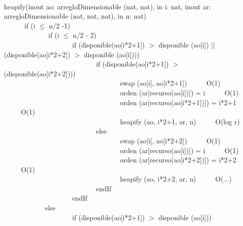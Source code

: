 \documentclass[a4paper,10pt]{article}
\begin{document}
\begin{algoritmo}
\caption{}\\
  heapify(inout ao: arregloDimensionable (nat, nat), in i: nat, inout ar:  arregloDimensionable (nat, nat, nat), in n: nat)\\
	\indent \ \ \ \ \ \  if (i $\leq$ n/2 -1)   \\
	\indent \ \ \ \ \ \ \ \ \ \ \ \ \ if (i $\leq$ n/2 - 2)   \\
	\indent \ \ \ \ \ \ \ \ \ \ \ \ \ \ \ \ \ \ \ \ if (disponible(ao[i*2+1]) $>$ disponible (ao[i]) $||$ (disponible(ao[i*2+2]) $>$ disponible (ao[i]))) \\
	\indent \ \ \ \ \ \ \ \ \ \ \ \ \ \ \ \ \ \ \ \ \ \ \ \ \ \ \ if (disponible(ao[i*2+1]) $>$ (disponible(ao[i*2+2])))  \\
	\indent \ \ \ \ \ \ \ \ \ \ \ \ \ \ \ \ \ \ \ \ \ \ \ \ \ \ \ \ \ \ \ \ \ \ swap (ao[i], ao[i*2+1]) \ \ \ \ \ O(1) \\
	\indent \ \ \ \ \ \ \ \ \ \ \ \ \ \ \ \ \ \ \ \ \ \ \ \ \ \ \ \ \ \ \ \ \ \ orden (ar[recurso(ao[i])]) = i  \ \ \ \ \ O(1) \\
	\indent \ \ \ \ \ \ \ \ \ \ \ \ \ \ \ \ \ \ \ \ \ \ \ \ \ \ \ \ \ \ \ \ \ \ orden (ar[recurso(ao[i*2+1])]) = i*2+1  \ \ \ \ \ O(1) \\
	\indent \ \ \ \ \ \ \ \ \ \ \ \ \ \ \ \ \ \ \ \ \ \ \ \ \ \ \ \ \ \ \ \ \ \ heapify (ao, i*2+1, ar, n) \ \ \ \ \ O(log r) \\
	\indent \ \ \ \ \ \ \ \ \ \ \ \ \ \ \ \ \ \ \ \ \ \ \ \ \ \ \ else \\
	\indent \ \ \ \ \ \ \ \ \ \ \ \ \ \ \ \ \ \ \ \ \ \ \ \ \ \ \ \ \ \ \ \ \ \ swap (ao[i], ao[i*2+2]) \ \ \ \ \ O(1) \\
	\indent \ \ \ \ \ \ \ \ \ \ \ \ \ \ \ \ \ \ \ \ \ \ \ \ \ \ \ \ \ \ \ \ \ \ orden (ar[recurso(ao[i])]) = i  \ \ \ \ \ O(1) \\
	\indent \ \ \ \ \ \ \ \ \ \ \ \ \ \ \ \ \ \ \ \ \ \ \ \ \ \ \ \ \ \ \ \ \ \ orden (ar[recurso(ao[i*2+2])]) = i*2+2  \ \ \ \ \ O(1) \\
	\indent \ \ \ \ \ \ \ \ \ \ \ \ \ \ \ \ \ \ \ \ \ \ \ \ \ \ \ \ \ \ \ \ \ \ heapify (ao, i*2+2, ar, n) \ \ \ \ \ O(...) \\
	\indent \ \ \ \ \ \ \ \ \ \ \ \ \ \ \ \ \ \ \ \ \ \ \ \ \ \ \ endIf \\
	\indent \ \ \ \ \ \ \ \ \ \ \ \ \ \ \ \ \ \ \ \  endIf \\
	\indent \ \ \ \ \ \ \ \ \ \ \ \  else \\
	\indent \ \ \ \ \ \ \ \ \ \ \ \ \ \ \ \ \ \ \ \ if (disponible(ao[i*2+1]) $>$ disponible (ao[i]))  \\

\end{algoritmo}
\end{document}
